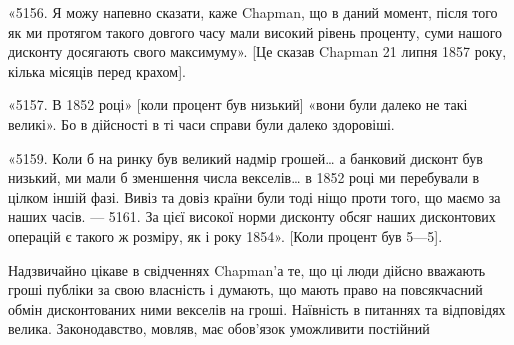 «5156. Я можу напевно сказати, каже Chapman, що в даний момент, після
того як ми протягом такого довгого часу мали високий рівень проценту, суми
нашого дисконту досягають свого максимуму». [Це сказав Chapman 21 липня
1857 року, кілька місяців перед крахом].

«5157. В 1852 році» [коли процент був низький] «вони були далеко не
такі великі». Бо в дійсності в ті часи справи були далеко здоровіші.

«5159. Коли б на ринку був великий надмір грошей\dots{} а банковий дисконт
був низький, ми мали б зменшення числа векселів\dots{} в 1852 році ми
перебували в цілком іншій фазі. Вивіз та довіз країни були тоді ніщо проти
того, що маємо за наших часів. — 5161. За цієї високої норми дисконту обсяг
наших дисконтових операцій є такого ж розміру, як і року 1854». [Коли процент
був 5—5].

Надзвичайно цікаве в свідченнях Chapman’а те, що ці люди дійсно вважають
гроші публіки за свою власність і думають, що мають право на повсякчасний
обмін дисконтованих ними векселів на гроші. Наївність в питаннях
та відповідях велика. Законодавство, мовляв, має обов’язок уможливити постійний
\parbreak{}  %
